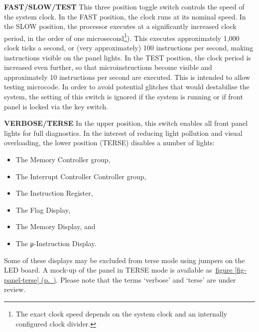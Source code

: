 \documentclass[11pt,a4paper,twocolumns]{article}
\newcommand{\cf}[2][section]{\hyperref[#2]{#1 \ref*{#2} (p.~\pageref*{#2})}}
\newcommand{\fcf}[1]{\cf[figure]{#1}}
\newcommand{\sw}[1]{\textsf{#1}}
\begin{document}
\begin{description}
\item{\bf\sw{FAST}/\sw{SLOW}/\sw{TEST}} This three position toggle
  switch controls the speed of the system clock. In the \sw{FAST}
  position, the clock runs at its nominal speed. In the \sw{SLOW}
  position, the processor executes at a significantly increased clock
  period, in the order of one microsecond\footnote{The exact clock
    speed depends on the system clock and an internally configured
    clock divider.}). This executes approximately 1,000 clock ticks a
  second, or (very approximately) 100 instructions per second, making
  instructions visible on the panel lights. In the \sw{TEST} position,
  the clock period is increased even further, so that
  microinstructions become visible and approximately 10 instructions
  per second are executed. This is intended to allow testing
  microcode. In order to avoid potential glitches that would
  destabilise the system, the setting of this switch is ignored if the
  system is running or if front panel is locked via the key switch.

\item{\bf\sw{VERBOSE}/\sw{TERSE}} In the upper position, this switch
  enables all front panel lights for full diagnostics. In the interest
  of reducing light pollution and visual overloading, the lower
  position (\sw{TERSE}) disables a number of lights:
\begin{itemize}
\item The Memory Controller group,
\item The Interrupt Controller Controller group,
\item The Instruction Register,
\item The Flag Display,
\item The Memory Display, and
\item The μ-Instruction Display.
\end{itemize}

Some of these displays may be excluded from terse mode using jumpers
on the LED board. A mock-up of the panel in \sw{TERSE} mode is
available as~\fcf{fig-panel-terse}. Please note that the terms
‘verbose’ and ‘terse’ are under review.


\end{description}
\end{document}
